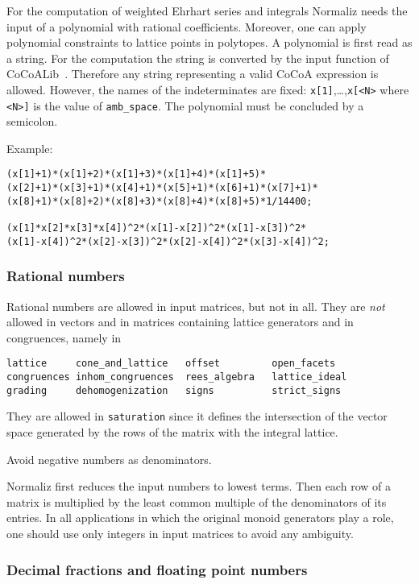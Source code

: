 For the computation of weighted Ehrhart series and integrals Normaliz needs the input of a polynomial with rational coefficients. Moreover, one can apply polynomial constraints to lattice points in polytopes. A polynomial is first read as a string. For the computation the string is converted by the input function of CoCoALib~\cite{CoCoA}. Therefore any string representing a valid CoCoA expression is allowed. However, the names of the indeterminates are fixed: \verb|x[1]|,\dots,\verb|x[<N>| where \verb|<N>]| is the value of \verb|amb_space|. The polynomial must be concluded by a semicolon.

Example:
\begin{Verbatim}
(x[1]+1)*(x[1]+2)*(x[1]+3)*(x[1]+4)*(x[1]+5)*
(x[2]+1)*(x[3]+1)*(x[4]+1)*(x[5]+1)*(x[6]+1)*(x[7]+1)*
(x[8]+1)*(x[8]+2)*(x[8]+3)*(x[8]+4)*(x[8]+5)*1/14400;

(x[1]*x[2]*x[3]*x[4])^2*(x[1]-x[2])^2*(x[1]-x[3])^2*
(x[1]-x[4])^2*(x[2]-x[3])^2*(x[2]-x[4])^2*(x[3]-x[4])^2;
\end{Verbatim}

\subsubsection{Rational numbers}\label{rational_input}

Rational numbers are allowed in input matrices, but not in all. They are \emph{not} allowed in vectors and in matrices containing lattice generators and in congruences, namely in
\begin{Verbatim}
lattice     cone_and_lattice   offset         open_facets
congruences inhom_congruences  rees_algebra   lattice_ideal
grading     dehomogenization   signs          strict_signs
\end{Verbatim}
They are allowed in \verb|saturation| since it defines the intersection of the vector space generated by the rows of the matrix with the integral lattice.

Avoid negative numbers as denominators.

Normaliz first reduces the input numbers to lowest terms. Then each row of a matrix is multiplied by the least common multiple of the denominators of its entries. In all applications in which the original monoid generators play a role, one should use only integers in input matrices to avoid any ambiguity.

\subsubsection{Decimal fractions and floating point numbers}\label{decimal_input}

